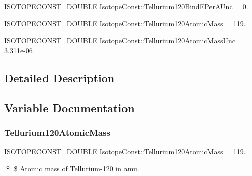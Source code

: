 \begin{DoxyCompactItemize}
\mbox{\hyperlink{group___isotope_const-_macros_ga8f45a7272ce02c0b4c65c44636ed719a}{I\+S\+O\+T\+O\+P\+E\+C\+O\+N\+S\+T\+\_\+\+D\+O\+U\+B\+LE}} \mbox{\hyperlink{group___isotope_const-_tellurium-_te120_gaf17f4e07a01c098f9a9086d5c21a0a5b}{Isotope\+Const\+::\+Tellurium120\+Bind\+E\+Per\+A\+Unc}} = 0.
\item 
\mbox{\hyperlink{group___isotope_const-_macros_ga8f45a7272ce02c0b4c65c44636ed719a}{I\+S\+O\+T\+O\+P\+E\+C\+O\+N\+S\+T\+\_\+\+D\+O\+U\+B\+LE}} \mbox{\hyperlink{group___isotope_const-_tellurium-_te120_ga9c635803aa057c8f128c82feae7143c9}{Isotope\+Const\+::\+Tellurium120\+Atomic\+Mass}} = 119.
\item 
\mbox{\hyperlink{group___isotope_const-_macros_ga8f45a7272ce02c0b4c65c44636ed719a}{I\+S\+O\+T\+O\+P\+E\+C\+O\+N\+S\+T\+\_\+\+D\+O\+U\+B\+LE}} \mbox{\hyperlink{group___isotope_const-_tellurium-_te120_gab1170844e682094d2cf4e35b291cdae3}{Isotope\+Const\+::\+Tellurium120\+Atomic\+Mass\+Unc}} = 3.\+311e-\/06
\end{DoxyCompactItemize}


\subsection{Detailed Description}


\subsection{Variable Documentation}
\mbox{\label{group___isotope_const-_tellurium-_te120_ga9c635803aa057c8f128c82feae7143c9}} 
\subsubsection{\texorpdfstring{Tellurium120\+Atomic\+Mass}{Tellurium120AtomicMass}}
{\footnotesize\ttfamily \mbox{\hyperlink{group___isotope_const-_macros_ga8f45a7272ce02c0b4c65c44636ed719a}{I\+S\+O\+T\+O\+P\+E\+C\+O\+N\+S\+T\+\_\+\+D\+O\+U\+B\+LE}} Isotope\+Const\+::\+Tellurium120\+Atomic\+Mass = 119.}

\$ \$ Atomic mass of Tellurium-\/120 in amu. \mbox{\label{group___isotope_const-_tellurium-_te120_gab1170844e682094d2cf4e35b291cdae3}} 
